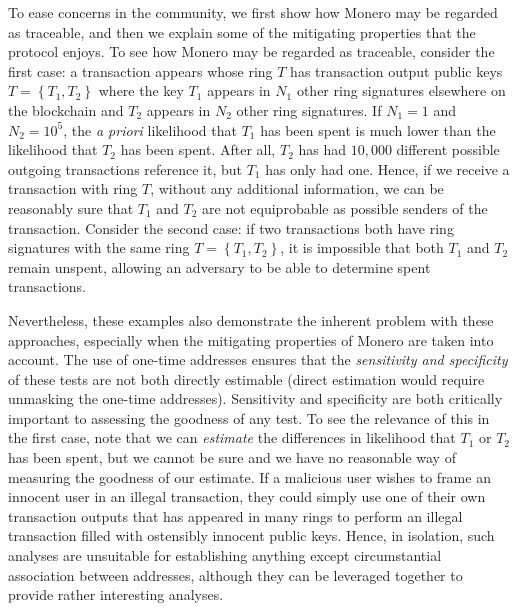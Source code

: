 \documentclass[12pt,english]{mrl}
\theoremstyle{definition}
\numberwithin{equation}{section}
\numberwithin{figure}{section}
\numberwithin{equation}{section}
\numberwithin{equation}{section}
\numberwithin{figure}{section}
\begin{document}
To ease concerns in the community, we first show how Monero may be regarded as traceable, and then we explain some of the mitigating properties that the protocol enjoys. To see how Monero may be regarded as traceable, consider the first case: a transaction appears whose ring $T$ has transaction output public keys $T = \left\{T_1, T_2\right\}$ where the key $T_1$ appears in $N_1$ other ring signatures elsewhere on the blockchain and $T_2$ appears in $N_2$ other ring signatures. If $N_1 = 1$ and $N_2 = 10^5$, the \textit{a priori} likelihood that $T_1$ has been spent is much lower than the likelihood that $T_2$ has been spent. After all, $T_2$ has had $10,000$ different possible outgoing transactions reference it, but $T_1$ has only had one. Hence, if we receive a transaction with ring $T$, without any additional information, we can be reasonably sure that $T_1$ and $T_2$ are not equiprobable as possible senders of the transaction. Consider the second case: if two transactions both have ring signatures with the same ring $T  = \left\{T_1, T_2\right\}$, it is impossible that both $T_1$ and $T_2$ remain unspent, allowing an adversary to be able to determine spent transactions.

Nevertheless, these examples also demonstrate the inherent problem with these approaches, especially when the mitigating properties of Monero are taken into account. The use of one-time addresses ensures that the \textit{sensitivity and specificity} of these tests are not both directly estimable (direct estimation would require unmasking the one-time addresses). Sensitivity and specificity are both critically important to assessing the goodness of any test.  To see the relevance of this in the first case, note that we can \textit{estimate} the differences in likelihood that $T_1$ or $T_2$ has been spent, but we cannot be sure and we have no reasonable way of measuring the goodness of our estimate. If a malicious user wishes to frame an innocent user in an illegal transaction, they could simply use one of their own transaction outputs that has appeared in many rings to perform an illegal transaction filled with ostensibly innocent public keys. Hence, in isolation, such analyses are unsuitable for establishing anything except circumstantial association between addresses, although they can be leveraged together to provide rather interesting analyses. 
\end{document}
